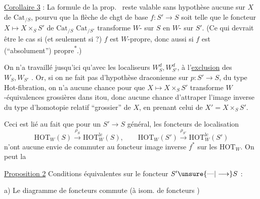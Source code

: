 \uline{Corollaire 3} : La formule de la prop.~ reste valable sans hypothèse aucune sur $X$ de $\mathrm{Cat}_{/S}$, pourvu que la flèche de chgt de base $f:S'\longrightarrow S$ soit telle que le foncteur $X\longmapsto X\times_S S'$ de $\mathrm{Cat}_{/S}$  $\mathrm{Cat}_{/S'}$
transforme $W$- sur $S$ en $W$- sur $S'$. (Ce qui devrait être le cas si (et seulement si ?) $f$ est  $W$-propre, donc aussi si $f$ est (``absolument'') propre\textsuperscript{*}.)

On n'a travaillé jusqu'ici qu'avec les localiseurs $W_S^d,W_{S'}^d$, à l'\uline{exclusion} des $W_S,W_{S'}$ . Or, si on ne fait pas d'hypothèse draconienne sur $p:S'\longrightarrow S$, du type Hot-fibration, on n'a aucune  chance pour que $X\longmapsto X\times_S S'$ transforme $W$-équivalences grossières dans itou, donc aucune chance d'attraper l'image inverse du type d'homotopie relatif ``grossier'' de $X$, en prenant celui de $X'=X\times_S S'$.

Ceci est lié au fait que pour un $S'\longrightarrow S$ général, les foncteurs de localisation
\[
\mathrm{HOT}_W(S)\xrightarrow{\rho_S}\mathrm{HOT}^{\mathrm{lc}}_W(S),\qquad
\mathrm{HOT}_W(S')\xrightarrow{\rho_{S'}}\mathrm{HOT}^{\mathrm{lc}}_W(S')
\]
n'ont aucune envie de commuter au foncteur image inverse $f^*$ sur les $\mathrm{HOT}_W$. On peut  la

\uline{Proposition 2} Conditions équivalentes sur le foncteur $S'\unsure{\text{---}|\longrightarrow}S$ :

a) Le diagramme de foncteurs
commute (à isom.  de foncteurs  )

